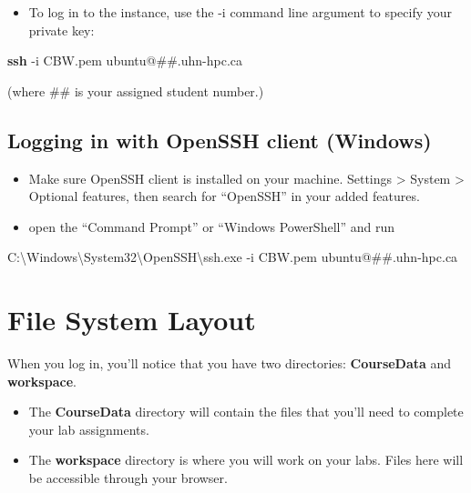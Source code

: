 \documentclass[
]{book}
\newenvironment{Shaded}{\begin{snugshade}}{\end{snugshade}}
\newcommand{\AttributeTok}[1]{\textcolor[rgb]{0.13,0.29,0.53}{#1}}
\newcommand{\ExtensionTok}[1]{#1}
\newcommand{\FunctionTok}[1]{\textcolor[rgb]{0.13,0.29,0.53}{\textbf{#1}}}
\newcommand{\NormalTok}[1]{#1}
\providecommand{\tightlist}{%
  \setlength{\itemsep}{0pt}\setlength{\parskip}{0pt}}
\begin{document}
\begin{itemize}
\tightlist
\item
  To log in to the instance, use the -i command line argument to specify your private key:
\end{itemize}

\begin{Shaded}
\begin{Highlighting}[]
 \FunctionTok{ssh} \AttributeTok{{-}i}\NormalTok{ CBW.pem ubuntu@\#\#.uhn{-}hpc.ca}
\end{Highlighting}
\end{Shaded}

(where \#\# is your assigned student number.)

\subsection{Logging in with OpenSSH client (Windows)}\label{logging-in-with-openssh-client-windows}

\begin{itemize}
\item
  Make sure OpenSSH client is installed on your machine. Settings \textgreater{} System \textgreater{} Optional features, then search for ``OpenSSH'' in your added features.
\item
  open the ``Command Prompt'' or ``Windows PowerShell'' and run
\end{itemize}

\begin{Shaded}
\begin{Highlighting}[]
 \ExtensionTok{C:\textbackslash{}Windows\textbackslash{}System32\textbackslash{}OpenSSH\textbackslash{}ssh.exe} \AttributeTok{{-}i}\NormalTok{ CBW.pem ubuntu@\#\#.uhn{-}hpc.ca}
\end{Highlighting}
\end{Shaded}

\section{File System Layout}\label{file-system-layout}

When you log in, you'll notice that you have two directories: \textbf{CourseData} and \textbf{workspace}.

\begin{itemize}
\item
  The \textbf{CourseData} directory will contain the files that you'll need to complete your lab assignments.
\item
  The \textbf{workspace} directory is where you will work on your labs. Files here will be accessible through your browser.
\end{itemize}
\end{document}
